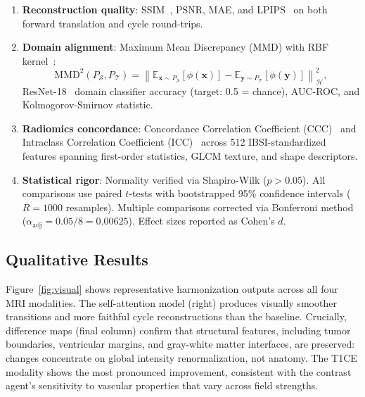 \documentclass{article}
\begin{document}
\begin{enumerate}
  \item \textbf{Reconstruction quality}: SSIM~\cite{wang2004ssim}, PSNR, MAE, and
        LPIPS~\cite{zhang2018lpips} on both forward translation and cycle
        round-trips.
  \item \textbf{Domain alignment}: Maximum Mean Discrepancy (MMD) with
        RBF kernel~\cite{gretton2012mmd}:
        \begin{equation}
          \mathrm{MMD}^2(P_\mathcal{S}, P_\mathcal{T}) =
          \left\| \mathbb{E}_{\mathbf{x}\sim P_\mathcal{S}}[\phi(\mathbf{x})]
                - \mathbb{E}_{\mathbf{y}\sim P_\mathcal{T}}[\phi(\mathbf{y})]
          \right\|_{\mathcal{H}}^2,
          \label{eq:mmd}
        \end{equation}
        ResNet-18~\cite{he2016resnet} domain classifier accuracy (target: 0.5 = chance), AUC-ROC, and
        Kolmogorov-Smirnov statistic.
  \item \textbf{Radiomics concordance}: Concordance Correlation Coefficient
        (CCC)~\cite{lin1989ccc} and Intraclass Correlation Coefficient
        (ICC)~\cite{shrout1979icc} across 512 IBSI-standardized~\cite{zwanenburg2020ibsi}
        features spanning first-order statistics, GLCM texture, and shape descriptors.
  \item \textbf{Statistical rigor}: Normality verified via Shapiro-Wilk ($p>0.05$).
        All comparisons use paired $t$-tests with bootstrapped 95\% confidence intervals
        ($R{=}1000$ resamples). Multiple comparisons corrected via Bonferroni method
        ($\alpha_{\mathrm{adj}}{=}0.05/8{=}0.00625$). Effect sizes reported as Cohen's
        $d$.
\end{enumerate}

\subsection{Qualitative Results}

Figure~\ref{fig:visual} shows representative harmonization outputs across all four MRI
modalities. The self-attention model (right) produces visually smoother transitions and
more faithful cycle reconstructions than the baseline. Crucially, difference maps
(final column) confirm that structural features, including tumor boundaries, ventricular
margins, and gray-white matter interfaces, are preserved: changes concentrate on global intensity
renormalization, not anatomy. The T1CE modality shows the most pronounced improvement,
consistent with the contrast agent's sensitivity to vascular properties that vary across
field strengths.
\end{document}
